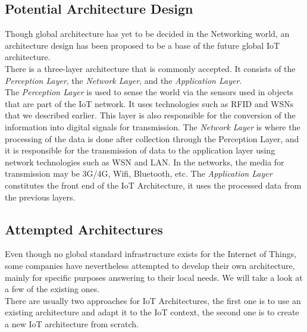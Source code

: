 \subsection{Potential Architecture Design}

Though global architecture has yet to be decided in the Networking world, an architecture design has been proposed to be a base of the future global IoT architecture. \\

There is a three-layer architecture that is commonly accepted. It consists of the \textit{Perception Layer}, the \textit{Network Layer}, and the \textit{Application Layer}. \\

The \textit{Perception Layer} is used to sense the world via the sensors used in objects that are part of the IoT network. It uses technologies such as RFID and WSNs that we described earlier. This layer is also responsible for the conversion of the information into digital signals for transmission. The \textit{Network Layer} is where the processing of the data is done after collection through the Perception Layer, and it is responsible for the transmission of data to the application layer using network technologies such as WSN and LAN. In the networks, the media for transmission may be 3G/4G, Wifi, Bluetooth, etc. The \textit{Application Layer} constitutes the front end of the IoT Architecture, it uses the processed data from the previous layers.\\


\subsection{Attempted Architectures}

Even though no global standard infrastructure exists for the Internet of Things, some companies have nevertheless attempted to develop their own architecture, mainly for specific purposes answering to their local needs. We will take a look at a few of the existing ones. \\

There are usually two approaches for IoT Architectures, the first one is to use an existing architecture and adapt it to the IoT context, the second one is to create a new IoT architecture from scratch.\\

